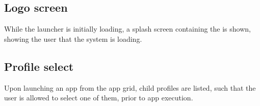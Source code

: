 %
\subsection{Logo screen}
\label{backlog:logo_screen}
While the launcher is initially loading, a splash screen containing the \giraf[] is shown, showing the user that the system is loading.

%
\subsection{Profile select}
\label{backlog:profile_select}
Upon launching an app from the app grid, child profiles are listed, such that the user is allowed to select one of them, prior to app execution.
